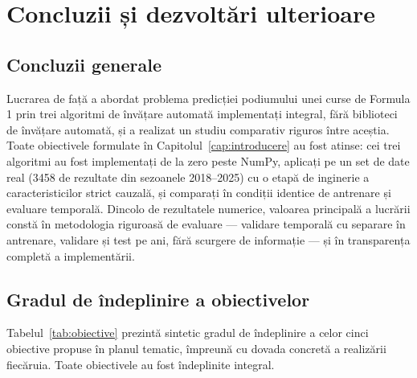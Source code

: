 \documentclass[12pt,a4paper]{report}
\begin{document}
\chapter{Concluzii și dezvoltări ulterioare}
\label{cap:concluzii}

\section{Concluzii generale}

Lucrarea de față a abordat problema predicției podiumului unei curse de Formula 1 prin trei
algoritmi de învățare automată implementați integral, fără biblioteci de învățare automată, și a
realizat un studiu comparativ riguros între aceștia. Toate obiectivele formulate în
Capitolul~\ref{cap:introducere} au fost atinse: cei trei algoritmi au fost implementați de la zero
peste NumPy, aplicați pe un set de date real (3458 de rezultate din sezoanele 2018--2025) cu o etapă
de inginerie a caracteristicilor strict cauzală, și comparați în condiții identice de antrenare și
evaluare temporală. Dincolo de rezultatele numerice, valoarea principală a lucrării constă în
metodologia riguroasă de evaluare --- validare temporală cu separare în antrenare, validare și test
pe ani, fără scurgere de informație --- și în transparența completă a implementării.

\section{Gradul de îndeplinire a obiectivelor}
\label{sec:obiective}

Tabelul~\ref{tab:obiective} prezintă sintetic gradul de îndeplinire a celor cinci obiective propuse
în planul tematic, împreună cu dovada concretă a realizării fiecăruia. Toate obiectivele au fost
îndeplinite integral.
\end{document}
